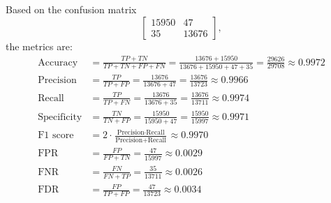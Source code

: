 Based on the confusion matrix
\[
    \begin{bmatrix}
        15950 & 47 \\
        35    & 13676
    \end{bmatrix},
\]
the metrics are:
\begin{align*}
    \text{Accuracy}    &= \frac{TP + TN}{TP + TN + FP + FN} = \frac{13676 + 15950}{13676 + 15950 + 47 + 35} = \frac{29626}{29708} \approx 0.9972 \\
    \text{Precision}   &= \frac{TP}{TP + FP} = \frac{13676}{13676 + 47} = \frac{13676}{13723} \approx 0.9966 \\
    \text{Recall}      &= \frac{TP}{TP + FN} = \frac{13676}{13676 + 35} = \frac{13676}{13711} \approx 0.9974 \\
    \text{Specificity} &= \frac{TN}{TN + FP} = \frac{15950}{15950 + 47} = \frac{15950}{15997} \approx 0.9971 \\
    \text{F1 score}    &= 2 \cdot \frac{\text{Precision} \cdot \text{Recall}}{\text{Precision} + \text{Recall}} \approx 0.9970 \\
    \text{FPR}         &= \frac{FP}{FP + TN} = \frac{47}{15997} \approx 0.0029 \\
    \text{FNR}         &= \frac{FN}{FN + TP} = \frac{35}{13711} \approx 0.0026 \\
    \text{FDR}         &= \frac{FP}{TP + FP} = \frac{47}{13723} \approx 0.0034
\end{align*}
